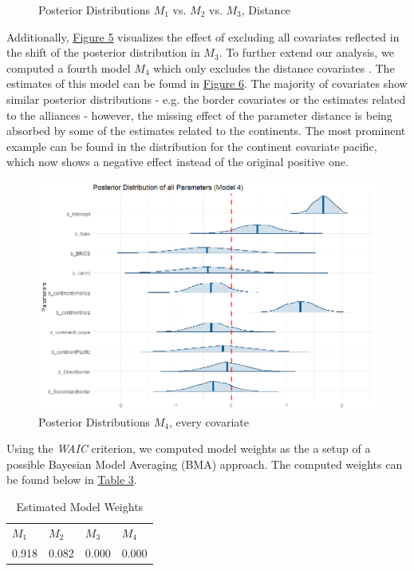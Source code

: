 \documentclass[12pt,a4paper]{article}
\begin{document}
\begin{figure}[h]
\caption{Posterior Distributions $M_1$ vs. $M_2$ vs. $M_3$, Distance}
\end{figure}

Additionally, \hyperref[F:5]{\color{blue}Figure 5} visualizes the effect of excluding all covariates reflected in the shift of the posterior distribution in $M_3$. To further extend our analysis, we computed a fourth model $M_4$ which only excludes the distance covariates . The estimates of this model can be found in \hyperref[F:6]{\color{blue}Figure 6}. The majority of covariates show similar posterior distributions - e.g. the border covariates or the estimates related to the alliances - however, the missing effect of the parameter distance is being absorbed by some of the estimates related to the continents. The most prominent example can be found in the distribution for the continent covariate pacific, which now shows a negative effect instead of the original positive one.

\begin{figure}[h]
\center
\label{F:6}
\includegraphics[scale=0.5]{PosteriorPlot_Everything_Model4NoDistnace.png}
\caption{Posterior Distributions $M_4$, every covariate}
\end{figure}


Using the \textit{WAIC} criterion, we computed model weights as the a setup of a possible Bayesian Model Averaging (BMA) approach. The computed weights can be found below in \hyperref[T:3]{\color{blue}Table 3}. 


\begin{table}[!htbp] \centering 
  \caption{Estimated Model Weights} 
  \label{T:3} 
\begin{tabular}{llll}
$M_1$& $M_2$ & $M_3$& $M_4$\\
0.918 & 0.082 & 0.000 & 0.000 \\
\end{tabular}
\end{table}
\end{document}
